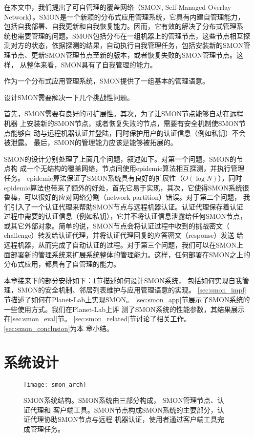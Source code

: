 在本文中，我们提出了可自管理的覆盖网络（SMON, Self-Managed Overlay
Network）。SMON是一个新颖的分布式应用管理系统，它具有内建自管理能力，
包括自我部署、自我更新和自我恢复能力。因而，它有效的解决了分布式管理系
统也需要管理的问题。SMON包括分布在一组机器上的管理节点，这些节点相互探
测对方的状态，依据探测的结果，自动执行自我管理任务，包括安装新的SMON管
理节点、更新SMON管理节点至新的版本，或者恢复失败的SMON管理节点。这样，
从整体来看，SMON具有了自我管理的能力。

作为一个分布式应用管理系统，SMON提供了一组基本的管理语意。

设计SMON需要解决一下几个挑战性问题。

首先，SMON需要有良好的可扩展性。其次，为了让SMON节点能够自动在远程机器
上安装新的SMON节点，或者恢复失败的节点，需要有安全机制使SMON节点能够自
动与远程机器认证并登陆，同时保护用户的认证信息（例如私钥）不会被泄露。
最后，SMON的管理能力应该是能够被拓展的。

SMON的设计分别处理了上面几个问题，叙述如下。对第一个问题，SMON的节点构
成一个无结构的覆盖网络，节点间使用epidemic算法相互探测，并执行管理任务。
epidemic算法保证了SMON系统具有良好的扩展性（$O(\log N)$），同时
epidemic算法也带来了额外的好处，首先它易于实现，其次，它使得SMON系统很
鲁棒，可以很好的应对网络分割（network partition）错误。对于第二个问题，
我们引入了一个认证代理来帮助SMON节点与远程机器认证。认证代理保存着认证
过程中需要的认证信息（例如私钥），它并不将认证信息泄露给任何SMON节点，
或其它外部对象。简单的说，SMON节点会将认证过程中收到的挑战密文（
challenge）转发给认证代理，并将认证代理回复的应答密文（response）发送
给远程机器，从而完成了自动认证的过程。对于第三个问题，我们可以在SMON上
面部署新的管理系统来扩展系统整体的管理能力。这样，任何部署在SMON之上的
分布式应用，都具有了自管理的能力。

本章接来下的部分安排如下：\ref{sec:smon_design}节描述如何设计SMON系统，
包括如何实现自我管理，SMON的安全机制、邻居列表维护与应用管理语意的实现。
\ref{sec:smon_impl}节描述了如何在Planet-Lab上实现SMON。
\ref{sec:smon_app}节展示了SMON系统的一些使用方式。我们在Planet-Lab上评
测了SMON系统的性能参数，其结果展示在\ref{sec:smon_eval}节。
\ref{sec:smon_related}节讨论了相关工作。\ref{sec:smon_conclusion}为本
章小结。


\section{系统设计}
\label{sec:smon_design}

\begin{figure}
  \centering
  \begin{minipage}{0.8\linewidth}
    \centering
    \texttt{[image: smon\_arch]}
    \caption[SMON系统结构]{SMON系统结构。SMON系统由三部分构成，
    SMON管理节点、认证代理和
    客户端工具。SMON节点构成SMON系统的主要部分，认证代理协助SMON节点与远程
    机器认证，使用者通过客户端工具完成管理任务。}
    \label{fig:smon_arch}
  \end{minipage}
\end{figure}

